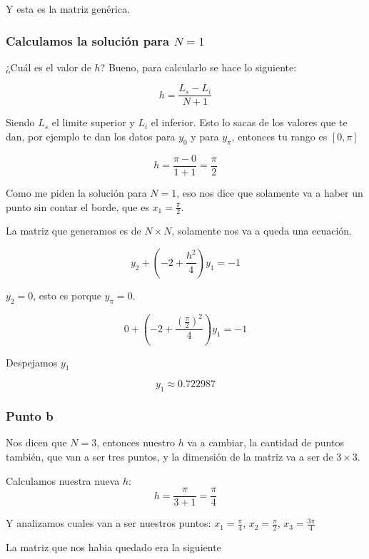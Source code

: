 Y esta es la matriz genérica. 

\subsubsection*{Calculamos la solución para $N=1$}

¿Cuál es el valor de $h$? Bueno, para calcularlo se hace lo siguiente: 

$$h = \frac{L_s - L_i}{N+1}$$

Siendo $L_s$ el limite superior y $L_i$ el inferior. Esto lo sacas de los valores que te dan, por ejemplo te dan los datos para $y_0$ y para $y_{\pi}$, entonces tu rango es $[0, \pi]$

$$h = \frac{\pi - 0}{1+1} = \frac{\pi}{2}$$

Como me piden la solución para $N=1$, eso nos dice que solamente va a haber un punto sin contar el borde, que es $x_1 = \frac{\pi}{2}$.

La matriz que generamos es de $N\times N$, solamente nos va a queda una ecuación.


$$y_2 + (-2 + \frac{h^2}{4})y_1 = -1$$

$y_2 = 0$, esto es porque $y_{\pi} = 0 $.

$$0 + (-2 + \frac{(\frac{\pi}{2})^2}{4})y_1 = -1$$


Despejamos $y_1$

$$y_1 \approx 0.722987 $$


\subsubsection{Punto b}

Nos dicen que $N = 3$, entonces nuestro $h$ va a cambiar, la cantidad de puntos también, que van a ser tres puntos, y la dimensión de la matriz va a ser de $3\times 3$. 

Calculamos nuestra nueva $h$: 
$$h = \frac{\pi}{ 3+ 1} = \frac{\pi}{4}$$

Y analizamos cuales van a ser nuestros puntos: $x_1=\frac{\pi}{4}$, $x_2 = \frac{\pi}{2}$, $x_3 = \frac{3\pi}{4}$

La matriz que nos habia quedado era la siguiente

